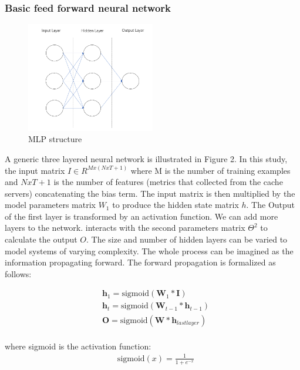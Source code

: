 \documentclass[5p]{elsarticle}
\begin{document}
\subsubsection{Basic feed forward neural network}
\begin{figure}[h]
    \centering
    \includegraphics[width=0.5\textwidth]{mlp.png}
    \caption{MLP structure}
    \label{fig:RNN}
\end{figure}

A generic three layered neural network is illustrated in Figure 2. In this study, the input matrix $I \in R^{Mx(NxT+1)}$  where M is the number of training examples and $NxT+1$ is the number of features (metrics that collected from the cache servers) concatenating the bias term. The input matrix is then multiplied by the model parameters matrix $W_1$ to produce the hidden state matrix $h$. The Output of the first layer is transformed by an activation function. We can add more layers to the network. interacts with the second parameters matrix $\Theta^2$ to calculate the output $O$. The size and number of hidden layers can be varied to model systems of varying complexity. The whole process can be imagined as the information propagating forward. The forward propagation is formalized as follows:

\begin{equation}
    \begin{split}
    & \mathbf h_1 = \text{sigmoid}(\mathbf W_1 * \mathbf I) \\
    & \mathbf h_t = \text{sigmoid}(\mathbf W_{t-1} * \mathbf h_{t-1}) \\
    & \mathbf O=\text{sigmoid}(\mathbf W * \mathbf h_{lastlayer}) \\
    \end{split}
\end{equation}

where sigmoid is the activation function:
\begin{equation}
    \begin{split}
    & \text{sigmoid}(x)=\frac{1}{1+e^{-x}}
    \end{split}
\end{equation}
\end{document}
